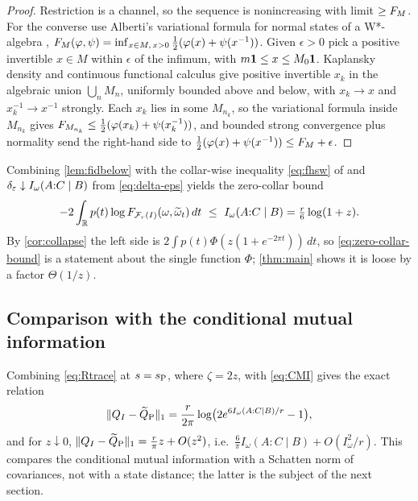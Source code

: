 \begin{proof}
Restriction is a channel, so the sequence is nonincreasing with limit
$\ge F_M$.  For the converse use Alberti's variational formula for normal states
of a W*-algebra \cite[Thm.~2]{AU02},
$F_M(\varphi,\psi)=\inf_{x\in M,\,x>0}\frac12(\varphi(x)+\psi(x^{-1}))$.  Given
$\epsilon>0$ pick a positive invertible $x\in M$ within $\epsilon$ of the
infimum, with $m\mathbf 1\le x\le M_0\mathbf 1$.  Kaplansky density and continuous
functional calculus give positive invertible $x_k$ in the algebraic union
$\bigcup_nM_n$, uniformly bounded above and below, with $x_k\to x$ and
$x_k^{-1}\to x^{-1}$ strongly.  Each $x_k$ lies in some $M_{n_k}$, so the
variational formula inside $M_{n_k}$ gives
$F_{M_{n_k}}\le\frac12(\varphi(x_k)+\psi(x_k^{-1}))$, and bounded strong
convergence plus normality send the right-hand side to
$\frac12(\varphi(x)+\psi(x^{-1}))\le F_M+\epsilon$.
\end{proof}

Combining \cref{lem:fidbelow} with the collar-wise inequality \eqref{eq:fhsw} of
\cite{FHSW} and $\delta_\varepsilon\downarrow I_\omega(A{:}C\mid B)$ from
\eqref{eq:delta-eps} yields the zero-collar bound
\begin{equation}\label{eq:zero-collar-bound}
 -2\int_{\mathbb R}p(t)\log F_{\mathcal F_r(I)}(\omega,\widetilde\omega_t)\,dt
 \ \le\ I_\omega(A{:}C\mid B)=\tfrac r6\log(1+z).
\end{equation}
By \cref{cor:collapse} the left side is
$2\int p(t)\Phi(z(1+e^{-2\pi t}))\,dt$, so \eqref{eq:zero-collar-bound} is a
statement about the single function $\Phi$; \cref{thm:main} shows it is loose by a
factor $\Theta(1/z)$.

\subsection{Comparison with the conditional mutual information}
Combining \eqref{eq:Rtrace} at $s=s_{\rm P}$, where $\zeta=2z$, with
\eqref{eq:CMI} gives the exact relation
\begin{equation}\label{eq:norm-CMI}
 \lVert Q_I-\widetilde Q_{\rm P}\rVert_1
 =\frac r{2\pi}\log\bigl(2e^{6I_\omega(A:C\mid B)/r}-1\bigr),
\end{equation}
and for $z\downarrow0$, $\lVert Q_I-\widetilde Q_{\rm P}\rVert_1=\frac r\pi z+O(z^2)$,
i.e.\ $\frac6\pi I_\omega(A{:}C\mid B)+O(I_\omega^2/r)$.  This compares the
conditional mutual information with a Schatten norm of covariances, not with a
state distance; the latter is the subject of the next section.

